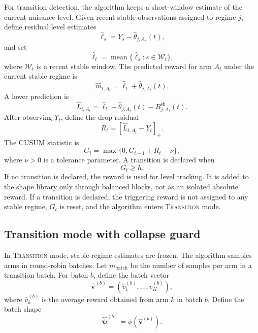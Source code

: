 \documentclass[11pt]{article}
\newcommand{\pos}[1]{\left[#1\right]_{+}}
\begin{document}
For transition detection, the algorithm keeps a short-window estimate of the current nuisance level. Given recent stable observations assigned to regime $j$, define residual level estimates
\begin{equation}
\label{eq:level_residuals}
\widehat\ell_s
=
Y_s-\widehat\theta_{j,A_s}(t),
\end{equation}
and set
\begin{equation}
\label{eq:current_level_estimate}
\widehat\ell_t
=
\operatorname{mean}\{\widehat\ell_s: s\in\mathcal W_t\},
\end{equation}
where $\mathcal W_t$ is a recent stable window. The predicted reward for arm $A_t$ under the current stable regime is
\begin{equation}
\label{eq:stable_prediction}
\widehat m_{t,A_t}
=
\widehat\ell_t+\widehat\theta_{j,A_t}(t).
\end{equation}
A lower prediction is
\begin{equation}
\label{eq:lower_prediction}
\widehat L_{t,A_t}
=
\widehat\ell_t+
\widehat\theta_{j,A_t}(t)-B_{j,A_t}^{\mathrm{sh}}(t).
\end{equation}
After observing $Y_t$, define the drop residual
\begin{equation}
\label{eq:drop_residual}
R_t
=
\pos{\widehat L_{t,A_t}-Y_t}.
\end{equation}
The CUSUM statistic is
\begin{equation}
\label{eq:cusum}
G_t
=
\max\{0,G_{t-1}+R_t-\nu\},
\end{equation}
where $\nu>0$ is a tolerance parameter. A transition is declared when
\begin{equation}
\label{eq:transition_alarm}
G_t\geq h.
\end{equation}
If no transition is declared, the reward is used for level tracking. It is added to the shape library only through balanced blocks, not as an isolated absolute reward. If a transition is declared, the triggering reward is not assigned to any stable regime, $G_t$ is reset, and the algorithm enters \textsc{Transition} mode.

\subsection{Transition mode with collapse guard}
\label{subsec:transition_mode}

In \textsc{Transition} mode, stable-regime estimates are frozen. The algorithm samples arms in round-robin batches. Let $m_{\mathrm{batch}}$ be the number of samples per arm in a transition batch. For batch $b$, define the batch vector
\begin{equation}
\label{eq:transition_batch_vector}
\widehat{\bm v}^{(b)}
=
(\widehat v_1^{(b)},\ldots,\widehat v_K^{(b)}),
\end{equation}
where $\widehat v_k^{(b)}$ is the average reward obtained from arm $k$ in batch $b$. Define the batch shape
\begin{equation}
\label{eq:transition_batch_shape}
\widehat{\bm\psi}^{(b)}
=
\phi(\widehat{\bm v}^{(b)}).
\end{equation}
\end{document}
